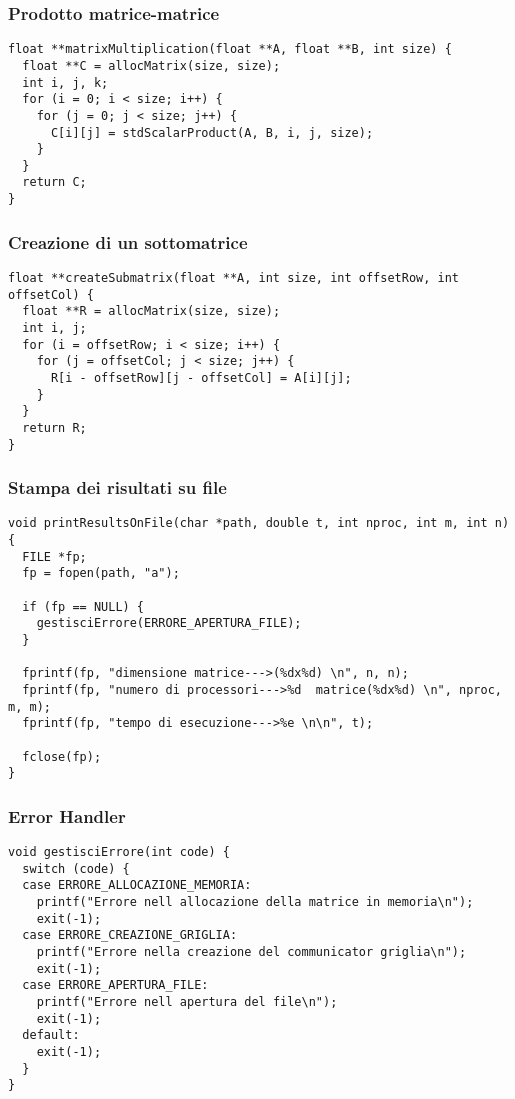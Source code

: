 \subsubsection{Prodotto matrice-matrice}
\begin{lstlisting}
float **matrixMultiplication(float **A, float **B, int size) {
  float **C = allocMatrix(size, size);
  int i, j, k;
  for (i = 0; i < size; i++) {
    for (j = 0; j < size; j++) {
      C[i][j] = stdScalarProduct(A, B, i, j, size);
    }
  }
  return C;
}
\end{lstlisting}
\subsubsection{Creazione di un sottomatrice}
\begin{lstlisting}
float **createSubmatrix(float **A, int size, int offsetRow, int offsetCol) {
  float **R = allocMatrix(size, size);
  int i, j;
  for (i = offsetRow; i < size; i++) {
    for (j = offsetCol; j < size; j++) {
      R[i - offsetRow][j - offsetCol] = A[i][j];
    }
  }
  return R;
}
\end{lstlisting}
\subsubsection{Stampa dei risultati su file}
\begin{lstlisting}
void printResultsOnFile(char *path, double t, int nproc, int m, int n) {
  FILE *fp;
  fp = fopen(path, "a");

  if (fp == NULL) {
    gestisciErrore(ERRORE_APERTURA_FILE);
  }

  fprintf(fp, "dimensione matrice--->(%dx%d) \n", n, n);
  fprintf(fp, "numero di processori--->%d  matrice(%dx%d) \n", nproc, m, m);
  fprintf(fp, "tempo di esecuzione--->%e \n\n", t);

  fclose(fp);
}
\end{lstlisting}
\subsubsection{Error Handler}
\begin{lstlisting}
void gestisciErrore(int code) {
  switch (code) {
  case ERRORE_ALLOCAZIONE_MEMORIA:
    printf("Errore nell allocazione della matrice in memoria\n");
    exit(-1);
  case ERRORE_CREAZIONE_GRIGLIA:
    printf("Errore nella creazione del communicator griglia\n");
    exit(-1);
  case ERRORE_APERTURA_FILE:
    printf("Errore nell apertura del file\n");
    exit(-1);
  default:
    exit(-1);
  }
}
\end{lstlisting}
